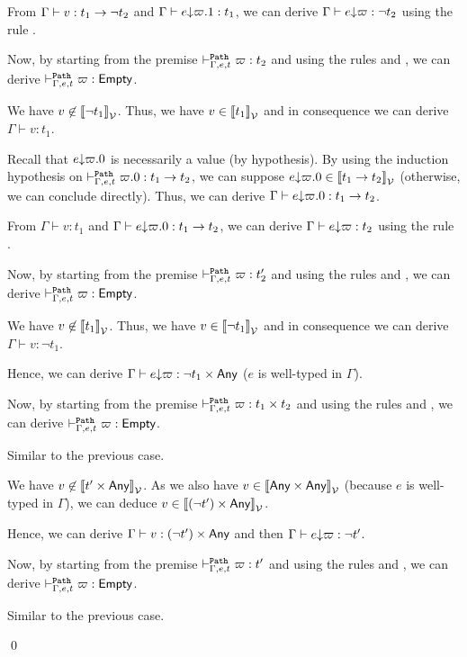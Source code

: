 \documentclass[a4paper]{article}
\theoremstyle{definition}
\begin{document}
\begin{description}
          From $\Gamma \vdash v:t_1\to \neg t_2$ and $\Gamma \vdash e{\downarrow}\varpi.1: t_1$, we can derive $\Gamma \vdash e{\downarrow}\varpi: \neg t_2$
          using the rule .

          Now, by starting from the premise $\vdash^{\texttt{Path}}_{\Gamma,e,t} \varpi:t_2$ and using the rules  and , we can derive
          $\vdash^{\texttt{Path}}_{\Gamma,e,t} \varpi:\textsf{Empty}$.
        
          \item[\Rule{PAppR}] We have $v \not\in {\llbracket \neg t_1 \rrbracket}_{\mathcal{V}}$. Thus, we have $v \in {\llbracket t_1 \rrbracket}_{\mathcal{V}}$ and in consequence
          we can derive $\Gamma \vdash v:t_1$. 

          Recall that $e{\downarrow}\varpi.0$ is necessarily a value (by hypothesis).
          By using the induction hypothesis on $\vdash^{\texttt{Path}}_{\Gamma,e,t} \varpi.0:t_1\to t_2$, we can suppose $e{\downarrow}\varpi.0 \in {\llbracket t_1\to t_2 \rrbracket}_{\mathcal{V}}$ (otherwise, we can conclude directly).
          Thus, we can derive $\Gamma \vdash e{\downarrow}\varpi.0: t_1\to t_2$.

          From $\Gamma \vdash v:t_1$ and $\Gamma \vdash e{\downarrow}\varpi.0: t_1\to t_2$, we can derive $\Gamma \vdash e{\downarrow}\varpi: t_2$
          using the rule .

          Now, by starting from the premise $\vdash^{\texttt{Path}}_{\Gamma,e,t} \varpi:t_2'$ and using the rules  and , we can derive
          $\vdash^{\texttt{Path}}_{\Gamma,e,t} \varpi:\textsf{Empty}$.

          \item[\Rule{PPairL}] We have $v \not\in {\llbracket t_1 \rrbracket}_{\mathcal{V}}$. Thus, we have $v \in {\llbracket \neg t_1 \rrbracket}_{\mathcal{V}}$
          and in consequence we can derive $\Gamma \vdash v:\neg t_1$.

          Hence, we can derive $\Gamma \vdash e{\downarrow}\varpi:\neg t_1\times \textsf{Any}$ ($e$ is well-typed in $\Gamma$).
     
          Now, by starting from the premise $\vdash^{\texttt{Path}}_{\Gamma,e,t} \varpi:t_1\times t_2$ and using the rules  and ,
          we can derive $\vdash^{\texttt{Path}}_{\Gamma,e,t} \varpi:\textsf{Empty}$.

          \item[\Rule{PPairR}] Similar to the previous case.

          \item[\Rule{PFst}] We have $v \not\in {\llbracket t'\times \textsf{Any}\rrbracket}_{\mathcal{V}}$.
          As we also have $v \in {\llbracket \textsf{Any}\times \textsf{Any}\rrbracket}_{\mathcal{V}}$ (because $e$ is well-typed in $\Gamma$),
          we can deduce $v \in {\llbracket (\neg t')\times \textsf{Any}\rrbracket}_{\mathcal{V}}$.

          Hence, we can derive $\Gamma \vdash v:(\neg t')\times \textsf{Any}$ and then $\Gamma \vdash e{\downarrow}\varpi:\neg t'$.
          
          Now, by starting from the premise $\vdash^{\texttt{Path}}_{\Gamma,e,t} \varpi:t'$ and using the rules  and ,
          we can derive $\vdash^{\texttt{Path}}_{\Gamma,e,t} \varpi:\textsf{Empty}$.
          \item[\Rule{PSnd}] Similar to the previous case.
        \end{description}
        \qed
\end{document}
